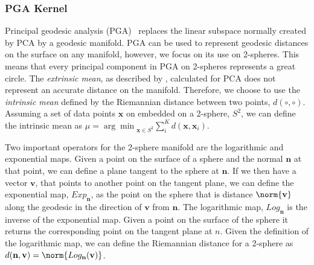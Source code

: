 \subsubsection{PGA Kernel}\label{subsubsec:singl_img_pga_kernel}
Principal geodesic analysis (PGA)~\cite{fletcher2004principal,smith2008facial} replaces the
linear subspace normally created by PCA by a geodesic manifold. PGA can be used
to represent geodesic distances on the surface on any manifold, however, we
focus on its use on 2-spheres. This means that every principal component in PGA
on 2-spheres represents a great circle. The \textit{extrinsic mean}, as
described by \citet{pennec2006intrinsic}, calculated for PCA does not represent
an accurate distance on the manifold. Therefore, we choose to use the
\textit{intrinsic mean} defined by the Riemannian distance between two points,
$d(\circ,\circ)$. Assuming a set of data points $\mathbf{x}$ on embedded on
a 2-sphere, $S^2$, we can define the intrinsic mean as $\mu =
{\arg\min}_{\mathbf{x} \in S^2} \sum_i^K d(\mathbf{x},
\mathbf{x}_i)$.

Two important operators for the 2-sphere manifold are the logarithmic and
exponential maps. Given a point on the surface of a sphere and the normal
$\mathbf{n}$ at that point, we can define a plane tangent to the sphere at
$\mathbf{n}$. If we then have a vector $\mathbf{v}$, that points to
another point on the tangent plane, we can define the exponential map,
$Exp_{\mathbf{n}}$, as the point on the sphere that is distance
$\norm{\mathbf{v}}$ along the geodesic in the direction of $\mathbf{v}$
from $\mathbf{n}$. The logarithmic map, $Log_{\mathbf{n}}$ is the
inverse of the exponential map. Given a point on the surface of the sphere it
returns the corresponding point on the tangent plane at $n$. Given the
definition of the logarithmic map, we can define the Riemannian distance for a
2-sphere as $d(\mathbf{n}, \mathbf{v}) = \norm{Log_{\mathbf{n}}(\mathbf{v})}$.

